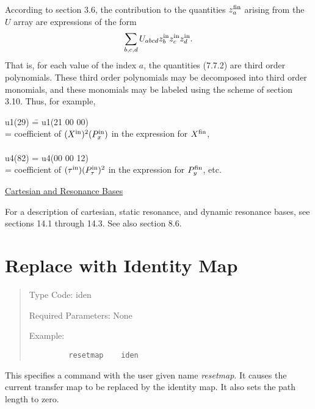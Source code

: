     According to section 3.6, the contribution to the quantities $z_a^{\mbox{\scriptsize fin}}$ arising from the $U$ array are expressions of the form
\begin{equation}
\sum_{b,c,d} U_{abcd} z_b^{\mbox{\scriptsize in}} z_c^{\mbox{\scriptsize in}}
z_d^{\mbox{\scriptsize in}}.
\end{equation}
That is, for each value of the index $a$, the quantities (7.7.2) are third
order polynomials.  These third order polynomials may be decomposed into
third order monomials, and these monomials may be labeled using the scheme
of section 3.10.  Thus, for example,

\begin{tabbing}
  u1(29) \= = u1(21 00 00)\\
        \> = coefficient of $(X^{\mbox{\scriptsize in}})^2 (P_x^{\mbox{\scriptsize in}}) $ in the expression for $X^{\mbox{\scriptsize fin}}$,\\
\vspace{5mm}\\
  u4(82) \> = u4(00 00 12)\\
        \> = coefficient of $(\tau^{\mbox{\scriptsize in}}) (P_\tau^{\mbox{\scriptsize in}})^2$ in the expression for $P_y^{\mbox{\scriptsize fin}}$, etc.
\end{tabbing}

\begin{center}
\underline{Cartesian and Resonance Bases}
\end{center}

For a description of cartesian, static resonance, and dynamic resonance
bases, see sections 14.1 through 14.3.  See also section 8.6.

\newpage
\section{Replace with Identity Map}
\begin{quotation}
\noindent Type Code:  iden
\vspace{5mm}

\noindent Required Parameters:  None
\vspace{5mm}

\noindent Example:
\begin{verbatim}
         resetmap    iden
\end{verbatim}
\end{quotation}
This specifies a command with the user given name {\em resetmap}.  It causes the
current transfer map to be replaced by the identity map.  It also sets the path length to zero.

